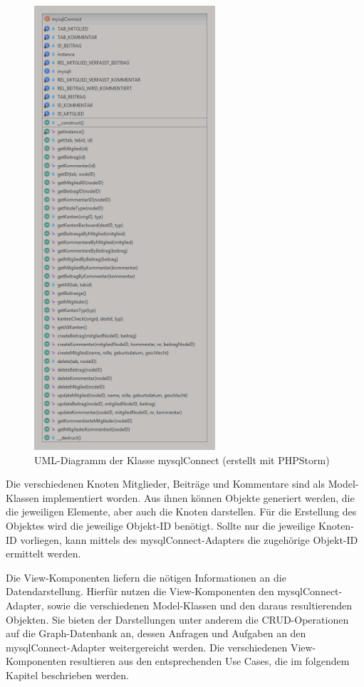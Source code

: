 \begin{figure}	
	\centering
	\includegraphics[width=0.6\textwidth]{images/mysqlConnect2.png}
	\caption{UML-Diagramm der Klasse \grqq mysqlConnect\grqq{} (erstellt mit PHPStorm)}
\end{figure}

Die verschiedenen Knoten Mitglieder, Beiträge und Kommentare sind als Model-Klassen implementiert worden. Aus ihnen können Objekte generiert werden, die die jeweiligen Elemente, aber auch die Knoten darstellen. Für die Erstellung des Objektes wird die jeweilige Objekt-ID benötigt. Sollte nur die jeweilige Knoten-ID vorliegen, kann mittels des mysqlConnect-Adapters die zugehörige Objekt-ID ermittelt werden.

Die View-Komponenten liefern die nötigen Informationen an die Datendarstellung. Hierfür nutzen die View-Komponenten den mysqlConnect-Adapter, sowie die verschiedenen Model-Klassen und den daraus resultierenden Objekten. Sie bieten der Darstellungen unter anderem die CRUD-Operationen auf die Graph-Datenbank an, dessen Anfragen und Aufgaben an den mysqlConnect-Adapter weitergereicht werden. Die verschiedenen View-Komponenten resultieren aus den entsprechenden Use Cases, die im folgendem Kapitel  beschrieben werden.

